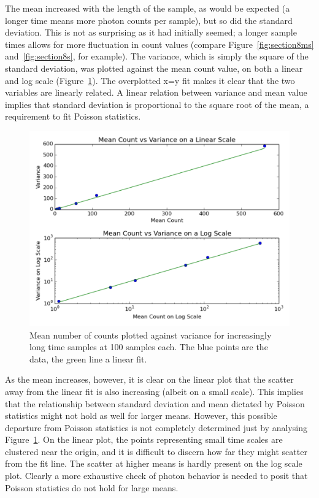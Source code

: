 \documentclass[a4paper,12pt]{article}
\begin{document}
The mean increased with the length of the sample, as would be expected (a longer time means more photon counts per sample), but so did the standard deviation. This is not as surprising as it had initially seemed; a longer sample times allows for more fluctuation in count values (compare Figure~\ref{fig:section8ms} and~\ref{fig:section8s}, for example). The variance, which is simply the square of the standard deviation, was plotted against the mean count value, on both a linear and log scale (Figure~\ref{fig:section7}). The overplotted x=y fit makes it clear that the two variables are linearly related. A linear relation between variance and mean value implies that standard deviation is proportional to the square root of the mean, a requirement to fit Poisson statistics.

\begin{figure}[h]
\centering
\includegraphics[width=\linewidth]{section7.pdf}
\caption{Mean number of counts plotted against variance for increasingly long time samples at 100 samples each. The blue points are the data, the green line a linear fit.}
\label{fig:section7}
\end{figure}

As the mean increases, however, it is clear on the linear plot that the scatter away from the linear fit is also increasing (albeit on a small scale). This implies that the relationship between standard deviation and mean dictated by Poisson statistics might not hold as well for larger means. However, this possible departure from Poisson statistics is not completely determined just by analysing Figure~\ref{fig:section7}. On the linear plot, the points representing small time scales are clustered near the origin, and it is difficult to discern how far they might scatter from the fit line. The scatter at higher means is hardly present on the log scale plot. Clearly a more exhaustive check of photon behavior is needed to posit that Poisson statistics do not hold for large means.
\end{document}
